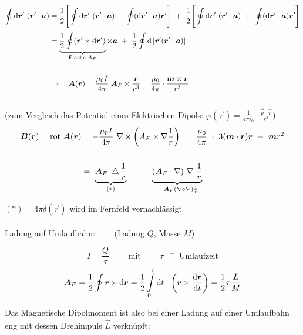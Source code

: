 \begin{align*}
\Oint{}{}{\vec{r}'} (\vec{r}'\cdot\vec{a}) &= \frac{1}{2}\Bigg[\Oint{}{}{\vec{r}'}(\vec{r}'\cdot\vec{a}) \ - \oint(\mathrm{d}\vec{r}'\cdot\vec{a})\vec{r}'\Bigg] \ + \ \frac{1}{2} \Bigg[\Oint{}{}{\vec{r}'}(\vec{r}'\cdot\vec{a}) \ + \ \oint(\mathrm{d}\vec{r}'\cdot\vec{a})\vec{r}'\Bigg]\\
&= \underbrace{\frac{1}{2}\oint(\vec{r}'\times\mathrm{d}\vec{r}')}_{\text{Fläche }A_F} \times\vec{a} \ + \ \frac{1}{2} \oint\mathrm{d}\left[\vec{r}'(\vec{r}'\cdot\vec{a})\right]\\ 
\ \\
& \Rightarrow \quad \vec{A}(\vec{r}) = \frac{\mu_0 I }{4\pi} \; \vec{A}_F\times\frac{\vec{r}}{r^3} = \frac{\mu_0}{4\pi} \cdot \frac{\vec{m}\times\vec{r}}{r^3}
\end{align*}
\ \\
(zum Vergleich das Potential eines Elektrischen Dipols: $\varphi(\vec{r}) = \frac{1}{4\pi\epsilon_0} \cdot \frac{\vec{p}\cdot\vec{r}}{r^3}$)
\ \\
\begin{align*}
\vec{B}(\vec{r}) = \rot\vec{A}(\vec{r}) &= - \frac{\mu_0 I}{4\pi} \ \nabla \times \left(A_F\times\nabla\frac{1}{r}\right) \ = \ \frac{\mu_0}{4\pi} \ \cdot \ 3(\vec{m}\cdot\vec{r})\vec{r} \ - \ \vec{m}r^2\\
\ \\
&= \ \underbrace{\vec{A}_F \ \laplace\frac{1}{r}}_{(*)} \quad - \quad \underbrace{(\vec{A}_F
\cdot\nabla)\ \nabla \ \frac{1}{r}}_{= \ \vec{A}_F (\nabla \circ \nabla) \frac{1}{r}}
\end{align*}

$(*) = 4\pi\delta(\vec{r})$ wird im Fernfeld vernachlässigt
\ \\
\ \\
\underline{Ladung auf Umlaufbahn}:$\qquad$ (Ladung $Q$, Masse $M$)

\begin{equation*}
I = \frac{Q}{\tau} \qquad \text{ mit } \qquad \tau \; \hat{=} \; \text{Umlaufzeit}
\end{equation*}
\begin{equation*}
\vec{A}_F = \frac{1}{2}\oint\vec{r}\times\mathrm{d}\vec{r} = \frac{1}{2}\Int{0}{\tau}{t} \ \left(\vec{r}\times\diff{\vec{r}}{t}\right) =\frac{1}{2}\tau \frac{\vec{L}}{M}
\end{equation*}

Das Magnetische Dipolmoment ist also bei einer Ladung auf einer Umlaufbahn eng mit dessen Drehimpuls $\vec{L}$ verknüpft:

